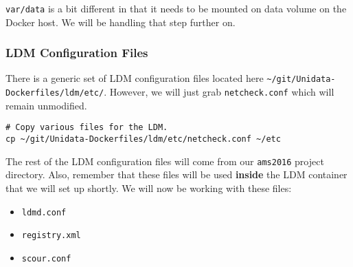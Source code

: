 \documentclass[onecolumn,9pt]{article}
\begin{document}
\texttt{var/data} is a bit different in that it needs to be mounted on data volume on the Docker host. We will be handling that step further on.

\subsubsection{LDM Configuration Files}
\label{sec:orgheadline24}

There is a generic set of LDM configuration files located here \texttt{\textasciitilde{}/git/Unidata-Dockerfiles/ldm/etc/}. However, we will just grab \texttt{netcheck.conf} which will remain unmodified.

\begin{verbatim}
# Copy various files for the LDM.
cp ~/git/Unidata-Dockerfiles/ldm/etc/netcheck.conf ~/etc
\end{verbatim}

The rest of the LDM configuration files will come from our \texttt{ams2016} project directory. Also, remember that these files will be used \textbf{inside} the LDM container that we will set up shortly. We will now be working with these files:

\begin{itemize}
\item \texttt{ldmd.conf}
\item \texttt{registry.xml}
\item \texttt{scour.conf}
\end{itemize}
\end{document}
